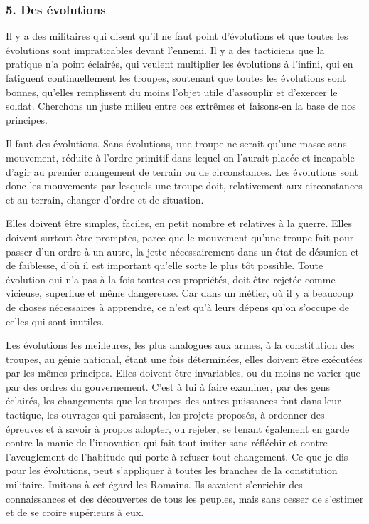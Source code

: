 \documentclass[french,twoside]{book} %
\begin{document}
\subsubsection[{5. Des évolutions}]{5. Des évolutions}
\noindent Il y a des militaires qui disent qu’il ne faut point d’évolutions et que toutes les évolutions sont impraticables devant l’ennemi. Il y a des tacticiens que la pratique n’a point éclairés, qui veulent multiplier les évolutions à l’infini, qui en fatiguent continuellement les troupes, soutenant que toutes les évolutions sont bonnes, qu’elles remplissent du moins l’objet utile d’assouplir et d’exercer le soldat. Cherchons un juste milieu entre ces extrêmes et faisons-en la base de nos principes.\par
Il faut des évolutions. Sans évolutions, une troupe ne serait qu’une masse sans mouvement, réduite à l’ordre primitif dans lequel on l’aurait placée et incapable d’agir au premier changement de terrain ou de circonstances. Les évolutions sont donc les mouvements par lesquels une troupe doit, relativement aux circonstances et au terrain, changer d’ordre et de situation.\par
Elles doivent être simples, faciles, en petit nombre et relatives à la guerre. Elles doivent surtout être promptes, parce que le mouvement qu’une troupe fait pour passer d’un ordre à un autre, la jette nécessairement dans un état de désunion et de faiblesse, d’où il est important qu’elle sorte le plus tôt possible. Toute évolution qui n’a pas à la fois toutes ces propriétés, doit être rejetée comme vicieuse, superflue et même dangereuse. Car dans un métier, où il y a beaucoup de choses nécessaires à apprendre, ce n’est qu’à leurs dépens qu’on s’occupe de celles qui sont inutiles.\par
Les évolutions les meilleures, les plus analogues aux armes, à la constitution des troupes, au génie national, étant une fois déterminées, elles doivent être exécutées par les mêmes principes. Elles doivent être invariables, ou du moins ne varier que par des ordres du gouvernement. C’est à lui à faire examiner, par des gens éclairés, les changements que les troupes des autres puissances font dans leur tactique, les ouvrages qui paraissent, les projets proposés, à ordonner des épreuves et à savoir à propos adopter, ou rejeter, se tenant également en garde contre la manie de l’innovation qui fait tout imiter sans réfléchir et contre l’aveuglement de l’habitude qui porte à refuser tout changement. Ce que je dis pour les évolutions, peut s’appliquer à toutes les branches de la constitution militaire. Imitons à cet égard les Romains. Ils savaient s’enrichir des connaissances et des découvertes de tous les peuples, mais sans cesser de s’estimer et de se croire supérieurs à eux.\par
\end{document}
